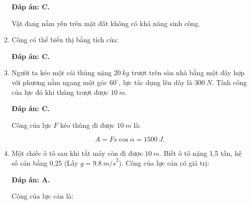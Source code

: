 \begin{enumerate}[label=\bfseries Câu \arabic*:, leftmargin=1.5cm]
	\hideall
	{	
		\textbf{Đáp án: C.}
		
		Vật đang nằm yên trên mặt đất không có khả năng sinh công.
	}
	\item {}
	
	
	{Công có thể biểu thị bằng tích của:
	}
	
	\hideall
	{	
		\textbf{Đáp án: C.}
	}
	\item {}
	
	
	{
		Người ta kéo một cái thùng nặng $\SI{20}{kg}$ trượt trên sàn nhà bằng một dây hợp với phương nằm ngang một góc $60^\circ$, lực tác dụng lên dây là $\SI{300}{N}$. Tính công của lực đó khi thùng trượt được $\SI{10}{m}$. 
	}
	
	\hideall
	{	
		\textbf{Đáp án: C.}
		
		Công của lực $F$ kéo thùng đi được $\SI{10}{m}$ là:
		
		$$A = Fs\cos \alpha = \SI{1500}{J}.$$
	}
	
	\item {}
	
	
	{Một chiếc ô tô sau khi tắt máy còn đi được $\SI{10}{m}$. Biết ô tô nặng 1,5 tấn, hệ số cản bằng 0,25 (Lấy $g = \SI{9,8}{m/s}^2$). Công của lực cản có giá trị:
	}
	
	\hideall
	{	
		\textbf{Đáp án: A.}
		
		Công của lực cản là: 
		
}
\end{enumerate}

